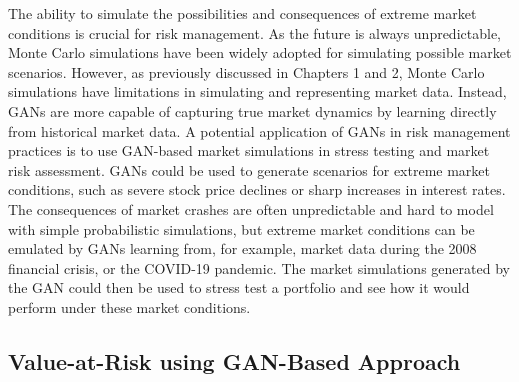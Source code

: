 The ability to simulate the possibilities and consequences of extreme market conditions is crucial for risk management. As the future is always unpredictable, Monte Carlo simulations have been widely adopted for simulating possible market scenarios. However, as previously discussed in Chapters 1 and 2, Monte Carlo simulations have limitations in simulating and representing market data. Instead, GANs are more capable of capturing true market dynamics by learning directly from historical market data. A potential application of GANs in risk management practices is to use GAN-based market simulations in stress testing and market risk assessment. GANs could be used to generate scenarios for extreme market conditions, such as severe stock price declines or sharp increases in interest rates. The consequences of market crashes are often unpredictable and hard to model with simple probabilistic simulations, but extreme market conditions can be emulated by GANs learning from, for example, market data during the 2008 financial crisis, or the COVID-19 pandemic. The market simulations generated by the GAN could then be used to stress test a portfolio and see how it would perform under these market conditions.

\subsection{Value-at-Risk using GAN-Based Approach}

